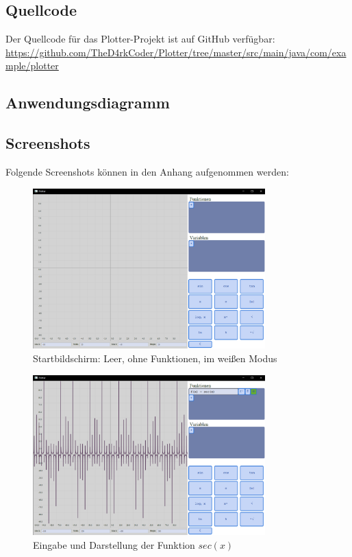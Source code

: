 \documentclass[a4paper]{article}
\begin{document}
\subsection{Quellcode}
Der Quellcode für das Plotter-Projekt ist auf GitHub verfügbar:
\url{https://github.com/TheD4rkCoder/Plotter/tree/master/src/main/java/com/example/plotter}

\subsection{Anwendungsdiagramm}


\clearpage

\subsection{Screenshots}
Folgende Screenshots können in den Anhang aufgenommen werden:
\begin{figure}[ht]
	\centering
	\includegraphics[width=0.8\textwidth]{Resources/startbildschirm.png}
	\caption{Startbildschirm: Leer, ohne Funktionen, im weißen Modus}
	\label{fig:startbildschirm}
\end{figure}

\begin{figure}[ht]
	\centering
	\includegraphics[width=0.8\textwidth]{Resources/eingabe_darstellung.png}
	\caption{Eingabe und Darstellung der Funktion $sec(x)$}
	\label{fig:eingabe_darstellung}
\end{figure}
\end{document}
